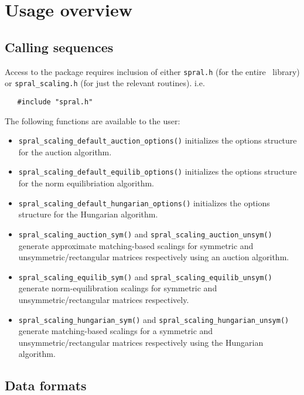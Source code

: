 
\section{Usage overview}

\subsection{Calling sequences}

Access to the package requires inclusion of either \texttt{spral.h} (for the
entire \spral\ library) or \texttt{spral\_scaling.h} (for just the relevant routines). i.e.

\begin{verbatim}
   #include "spral.h"
\end{verbatim}

\newpage
\noindent
The following functions are available to the user:
\begin{itemize}
\item {\tt spral\_scaling\_default\_auction\_options()} initializes the options structure for the auction algorithm.
\item {\tt spral\_scaling\_default\_equilib\_options()} initializes the options structure for the norm equilibriation algorithm.
\item {\tt spral\_scaling\_default\_hungarian\_options()} initializes the options structure for the Hungarian algorithm.
\item {\tt spral\_scaling\_auction\_sym()} and \texttt{spral\_scaling\_auction\_unsym()} generate approximate matching-based scalings for symmetric and unsymmetric/rectangular matrices respectively using an auction algorithm.
\item {\tt spral\_scaling\_equilib\_sym()} and \texttt{spral\_scaling\_equilib\_unsym()} generate norm-equilibration scalings for symmetric and unsymmetric/rectangular matrices respectively.
\item {\tt spral\_scaling\_hungarian\_sym()} and \texttt{spral\_scaling\_hungarian\_unsym()} generate matching-based scalings for a symmetric and unsymmetric/rectangular matrices respectively using the Hungarian algorithm.
\end{itemize}

\subsection{Data formats} \label{dataformats}

